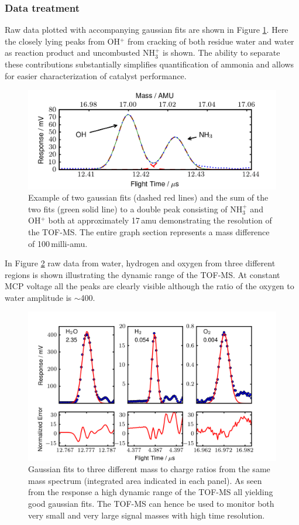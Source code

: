 \documentclass[aip,rsi]{revtex4-1}
\begin{document}
\subsubsection{Data treatment}
Raw data plotted with accompanying gaussian fits are shown in Figure \ref{fig:gaussian_fit}. Here the closely lying peaks from OH$^{+}$ from cracking of both residue water and water as reaction product and uncombusted NH$_3^{+}$ is shown. The ability to separate these contributions substantially simplifies quantification of ammonia and allows for easier characterization of catalyst performance. 
\begin{figure}
 \includegraphics[width=14cm]{ammonia_OH_gauss_fit.png}%
 \caption{Example of two gaussian fits (dashed red lines) and the sum of the two fits (green solid line) to a double peak consisting of NH$_{3}^{+}$ and OH$^{+}$ both at approximately 17\,amu demonstrating the resolution of the TOF-MS. The entire graph section represents a mass difference of 100\,milli-amu.\label{fig:gaussian_fit}}%
\end{figure}
In Figure \ref{fig:dynamic_range} raw data from water, hydrogen and oxygen from three different regions is shown illustrating the dynamic range of the TOF-MS. At constant MCP voltage all the peaks are clearly visible although the ratio of the oxygen to water amplitude is $\sim$400. 
\begin{figure}
 \includegraphics[width=14cm]{dynamic_range.png}%
 \caption{Gaussian fits to three different mass to charge ratios from the same mass spectrum (integrated area indicated in each panel). As seen from the response a high dynamic range of the TOF-MS all yielding good gaussian fits. The TOF-MS can hence be used to monitor both very small and very large signal masses with high time resolution.\label{fig:dynamic_range}}%
\end{figure}
\end{document}
